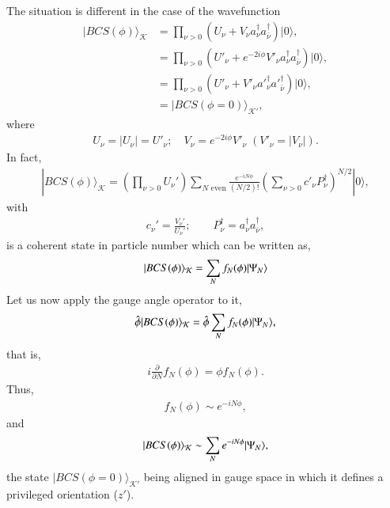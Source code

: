 The situation is  different in the case of the wavefunction
\begin{align}\label{eq3.7.7}
\nonumber|BCS(\phi)\rangle_{\mathcal{K}} &=\prod_{\nu>0}\left(U_\nu+V_\nu a_\nu^\dagger a_{\bar \nu}^{\dagger}\right)|0\rangle,\\
\nonumber&=\prod_{\nu>0}\left(U'_\nu+e^{-2i\phi}V'_\nu a^\dagger_\nu a^{\dagger}_{\bar \nu}\right)|0\rangle,\\
\nonumber&=\prod_{\nu>0}\left(U'_\nu+V'_\nu a'^\dagger_\nu a'^{\dagger}_{\bar \nu}\right)|0\rangle,\\
&=|BCS(\phi=0)\rangle_{\mathcal{K'}},
\end{align}
where 
\begin{align}
U_\nu=|U_\nu|=U'_\nu;\quad V_\nu=e^{-2i\phi}V'_\nu \;(V'_\nu=|V_\nu|).
\end{align}
In fact,
\begin{align}\label{eq3.7.19}
|BCS(\phi)\rangle_{\mathcal{K}}=\left(\prod_{\nu>0}U_\nu'\right)\sum_{N\text{ even}}\frac{e^{-iN\phi}}{(N/2)!}\left(\sum_{\nu>0}c'_\nu P^\dagger_\nu\right)^{N/2}|0\rangle,
\end{align}
with
\begin{align}
c_\nu'=\frac{V_\nu'}{U_\nu'};\quad \quad P^\dagger_\nu=a^\dagger_\nu a^\dagger_{\bar\nu},
\end{align}
is a coherent state in particle number which can be written as,
\begin{align}\label{eq3.7.21}
|{BCS(\phi)} \rangle_{\mathcal K}=\sum_N f_N(\phi)|{\Psi_N} \rangle
\end{align}
Let us now apply the gauge angle operator to it,
\begin{align}
\hat{\phi}|{BCS(\phi)} \rangle_{\mathcal K}=\hat{\phi}\sum_{N}f_N(\phi)|{\Psi_N} \rangle,
\end{align}
that is,
\begin{align}
i\frac{\partial}{\partial N}f_N(\phi)=\phi f_N(\phi).
\end{align}
Thus,
\begin{align}
f_N(\phi)\sim e^{-iN\phi},
\end{align}
and
\begin{align}
|{BCS(\phi)} \rangle_{\mathcal K}\sim \sum_{N} e^{-iN\phi}|{\Psi_N} \rangle,
\end{align}
 the state $|BCS(\phi=0)\rangle_{\mathcal{K}'}$ being aligned in gauge space in which it defines a privileged orientation ($z'$).


